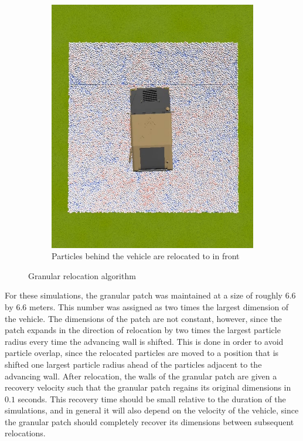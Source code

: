\documentclass[12pt,onecolumn]{report}
\begin{document}
\begin{figure}
\begin{subfigure}[b]{0.49\columnwidth}
		\includegraphics[width=\columnwidth]{Figs/justRelocated.png}
		\caption{\small Particles behind the vehicle are relocated to in front}   
		\label{fig:relocate}
	\end{subfigure}
	\caption{\small Granular relocation algorithm}
	\label{fig:relocationPics}
\end{figure}

For these simulations, the granular patch was maintained at a size of roughly $6.6$ by $6.6$ meters.  This number was assigned as two times the largest dimension of the vehicle.  The dimensions of the patch are not constant, however, since the patch expands in the direction of relocation by two times the largest particle radius every time the advancing wall is shifted.  This is done in order to avoid particle overlap, since the relocated particles are moved to a position that is shifted one largest particle radius ahead of the particles adjacent to the advancing wall.  After relocation, the walls of the granular patch are given a recovery velocity such that the granular patch regains its original dimensions in $0.1$ seconds.  This recovery time should be small relative to the duration of the simulations, and in general it will also depend on the velocity of the vehicle, since the granular patch should completely recover its dimensions between subsequent relocations.
\end{document}
